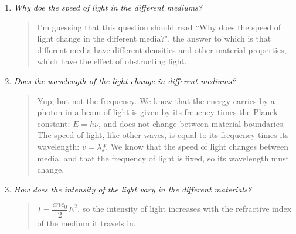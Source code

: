 \documentclass{amsart}
\begin{document}
\begin{enumerate}
\item {\textit{Why doe the speed of light in the different mediums?}
\begin{quote}
I'm guessing that this question should read ``Why does the speed of light change in the different media?", the answer to which is that different media have different densities and other material properties, which have the effect of obstructing light.
\end{quote}}

\item{\textit{Does the wavelength of the light change in different mediums?}
\begin{quote}
    Yup, but not the frequency. We know that the energy carries by a photon in a beam of light is given by its freuency times the Planck constant: $E = h\nu$, and does not change between material boundaries. The speed of light, like other waves, is equal to its frequency times its wavelength: $v = \lambda f$. We know that the speed of light changes between media, and that the frequency of light is fixed, so its wavelength must change.
\end{quote}}

\item{\textit{How does the intensity of the light vary in the different materials?}
\begin{quote}
    $I = \dfrac{cn\epsilon_0}{2}E^2$, so the intensity of light increases with the refractive index of the medium it travels in.
\end{quote}}

\end{enumerate}
\end{document}
